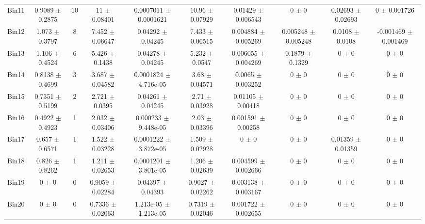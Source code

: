 \begin{tabular}{@{\extracolsep{4pt}}lccccccccc@{}}
     Bin11 & 0.9089 $\pm$ 0.2875 & 10 & 11 $\pm$ 0.08401 & 0.0007011 $\pm$ 0.0001621 & 10.96 $\pm$ 0.07929 & 0.01429 $\pm$ 0.006543 & 0 $\pm$ 0 & 0.02693 $\pm$ 0.02693 & 0 $\pm$ 0.001726 \\ 
     Bin12 & 1.073 $\pm$ 0.3797 & 8 & 7.452 $\pm$ 0.06647 & 0.04292 $\pm$ 0.04245 & 7.433 $\pm$ 0.06515 & 0.004884 $\pm$ 0.005269 & 0.005248 $\pm$ 0.005248 & 0.0108 $\pm$ 0.0108 & -0.001469 $\pm$ 0.001469 \\ 
     Bin13 & 1.106 $\pm$ 0.4524 & 6 & 5.426 $\pm$ 0.1438 & 0.04278 $\pm$ 0.04245 & 5.232 $\pm$ 0.0547 & 0.006055 $\pm$ 0.004269 & 0.1879 $\pm$ 0.1329 & 0 $\pm$ 0 & 0 $\pm$ 0 \\ 
     Bin14 & 0.8138 $\pm$ 0.4699 & 3 & 3.687 $\pm$ 0.04582 & 0.0001824 $\pm$ 4.716e-05 & 3.68 $\pm$ 0.04571 & 0.0065 $\pm$ 0.003252 & 0 $\pm$ 0 & 0 $\pm$ 0 & 0 $\pm$ 0 \\ 
     Bin15 & 0.7351 $\pm$ 0.5199 & 2 & 2.721 $\pm$ 0.0395 & 0.04261 $\pm$ 0.04245 & 2.71 $\pm$ 0.03928 & 0.01105 $\pm$ 0.00418 & 0 $\pm$ 0 & 0 $\pm$ 0 & 0 $\pm$ 0 \\ 
     Bin16 & 0.4922 $\pm$ 0.4923 & 1 & 2.032 $\pm$ 0.03406 & 0.000233 $\pm$ 9.448e-05 & 2.03 $\pm$ 0.03396 & 0.001591 $\pm$ 0.00258 & 0 $\pm$ 0 & 0 $\pm$ 0 & 0 $\pm$ 0 \\ 
     Bin17 & 0.657 $\pm$ 0.6571 & 1 & 1.522 $\pm$ 0.03228 & 0.0001222 $\pm$ 3.872e-05 & 1.509 $\pm$ 0.02928 & 0 $\pm$ 0 & 0 $\pm$ 0 & 0.01359 $\pm$ 0.01359 & 0 $\pm$ 0 \\ 
     Bin18 & 0.826 $\pm$ 0.8262 & 1 & 1.211 $\pm$ 0.02653 & 0.0001201 $\pm$ 3.801e-05 & 1.206 $\pm$ 0.02639 & 0.004599 $\pm$ 0.002666 & 0 $\pm$ 0 & 0 $\pm$ 0 & 0 $\pm$ 0 \\ 
     Bin19 & 0 $\pm$ 0 & 0 & 0.9059 $\pm$ 0.02284 & 0.04397 $\pm$ 0.04393 & 0.9027 $\pm$ 0.02262 & 0.003138 $\pm$ 0.003167 & 0 $\pm$ 0 & 0 $\pm$ 0 & 0 $\pm$ 0 \\ 
     Bin20 & 0 $\pm$ 0 & 0 & 0.7336 $\pm$ 0.02063 & 1.213e-05 $\pm$ 1.213e-05 & 0.7319 $\pm$ 0.02046 & 0.001722 $\pm$ 0.002655 & 0 $\pm$ 0 & 0 $\pm$ 0 & 0 $\pm$ 0 \\ 
\hline\hline
  \end{tabular}

